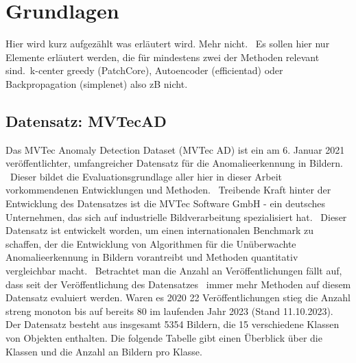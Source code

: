 
\chapter{Grundlagen}\label{ch:Grundlagen}
Hier wird kurz aufgezählt was erläutert wird. Mehr nicht. \
Es sollen hier nur Elemente erläutert werden, die für mindestens zwei der Methoden relevant sind.\
k-center greedy (PatchCore), Autoencoder (efficientad) oder Backpropagation (simplenet) also zB nicht.\

\section{Datensatz: MVTecAD\cite{mvtecad}}\label{sec:DatensatzMVTecAD}
Das \glqq MVTec Anomaly Detection Dataset\grqq{} (MVTec AD) ist ein am 6. Januar 2021 veröffentlichter, umfangreicher Datensatz für die Anomalieerkennung in Bildern. \
Dieser bildet die Evaluationsgrundlage aller hier in dieser Arbeit vorkommendenen Entwicklungen und Methoden. \
Treibende Kraft hinter der Entwicklung des Datensatzes ist die MVTec Software GmbH - ein deutsches Unternehmen, das sich auf industrielle Bildverarbeitung spezialisiert hat. \
Dieser Datensatz ist entwickelt worden, um einen internationalen Benchmark zu schaffen, der die Entwicklung von Algorithmen für die Unüberwachte Anomalieerkennung in Bildern vorantreibt und Methoden quantitativ vergleichbar macht. \
Betrachtet man die Anzahl an Veröffentlichungen fällt auf, dass seit der Veröffentlichung des Datensatzes \
immer mehr Methoden auf diesem Datensatz evaluiert werden. Waren es 2020 22 Veröffentlichungen stieg die Anzahl streng monoton bis auf bereits 80 im laufenden Jahr 2023 (Stand 11.10.2023).\cite{paperswithcode} \\
Der Datensatz besteht aus insgesamt 5354 Bildern, die 15 verschiedene Klassen von Objekten enthalten. Die folgende Tabelle gibt einen Überblick über die Klassen und die Anzahl an Bildern pro Klasse. \
